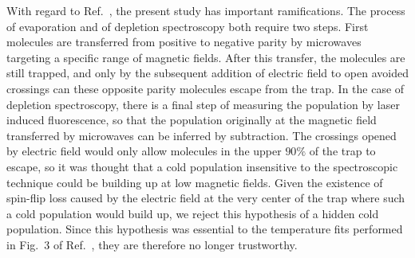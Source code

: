 \documentclass[%
 reprint,
 amsmath,amssymb,
 aps,
pra,
]{revtex4-1}
\begin{document}
With regard to Ref.~\cite{Stuhl2012evap}, the present study has important ramifications. 
The process of evaporation and of depletion spectroscopy both require two steps.
First molecules are transferred from positive to negative parity by microwaves targeting a specific range of magnetic fields.
After this transfer, the molecules are still trapped, and only by the subsequent addition of electric field to open avoided crossings can these opposite parity molecules escape from the trap.
In the case of depletion spectroscopy, there is a final step of measuring the population by laser induced fluorescence, so that the population originally at the magnetic field transferred by microwaves can be inferred by subtraction.
The crossings opened by electric field would only allow molecules in the upper $90\%$ of the trap to escape, so it was thought that a cold population insensitive to the spectroscopic technique could be building up at low magnetic fields.
Given the existence of spin-flip loss caused by the electric field at the very center of the trap where such a cold population would build up, we reject this hypothesis of a hidden cold population.
Since this hypothesis was essential to the temperature fits performed in Fig.~3 of Ref.~\cite{Stuhl2012evap}, they are therefore no longer trustworthy.

\end{document}
